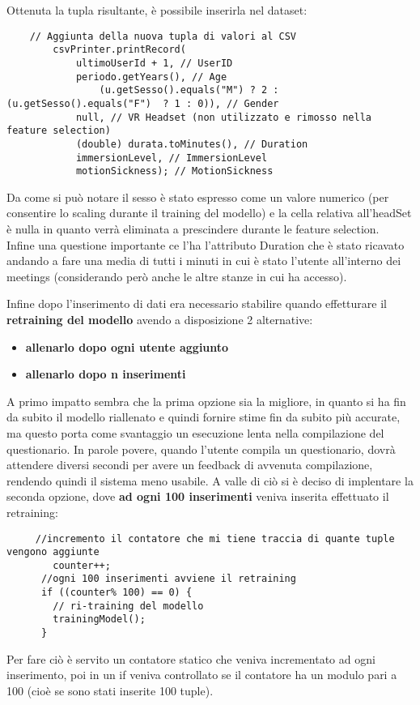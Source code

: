 Ottenuta la tupla risultante, è possibile inserirla nel dataset: \\

\begin{lstlisting}
    // Aggiunta della nuova tupla di valori al CSV
        csvPrinter.printRecord(
            ultimoUserId + 1, // UserID
            periodo.getYears(), // Age
                (u.getSesso().equals("M") ? 2 : (u.getSesso().equals("F")  ? 1 : 0)), // Gender
            null, // VR Headset (non utilizzato e rimosso nella feature selection)
            (double) durata.toMinutes(), // Duration
            immersionLevel, // ImmersionLevel
            motionSickness); // MotionSickness
\end{lstlisting}

Da come si può notare il sesso è stato espresso come un valore numerico (per consentire lo scaling durante il training del modello) e la cella relativa all'headSet è nulla in quanto verrà eliminata a prescindere durante le feature selection. \\
Infine una questione importante ce l'ha l'attributo Duration che è stato ricavato andando a fare una media di tutti i minuti in cui è stato l'utente all'interno dei meetings (considerando però anche le altre stanze in cui ha accesso).  

Infine dopo l'inserimento di dati era necessario stabilire quando effetturare il \textbf{retraining del modello} avendo a disposizione 2 alternative:
\par{
\begin{itemize}
   \item \textbf{allenarlo dopo ogni utente aggiunto}
   \item \textbf{allenarlo dopo n inserimenti}
\end{itemize}
}
A primo impatto sembra che la prima opzione sia la migliore, in quanto si ha fin da subito il modello riallenato e quindi fornire stime fin da subito più accurate, ma questo porta come svantaggio un esecuzione lenta nella compilazione del questionario. In parole povere, quando l'utente compila un questionario, dovrà attendere diversi secondi per avere un feedback di avvenuta compilazione, rendendo quindi il sistema meno usabile.
A valle di ciò si è deciso di implentare la seconda opzione, dove \textbf{ad ogni 100 inserimenti} veniva inserita effettuato il retraining:
\begin{lstlisting}
     //incremento il contatore che mi tiene traccia di quante tuple vengono aggiunte
        counter++;
      //ogni 100 inserimenti avviene il retraining
      if ((counter% 100) == 0) {
        // ri-training del modello
        trainingModel();
      }
\end{lstlisting}
Per fare ciò è servito un contatore statico che veniva incrementato ad ogni inserimento, poi in un if veniva controllato se il contatore ha un modulo pari a 100 (cioè se sono stati inserite 100 tuple).

